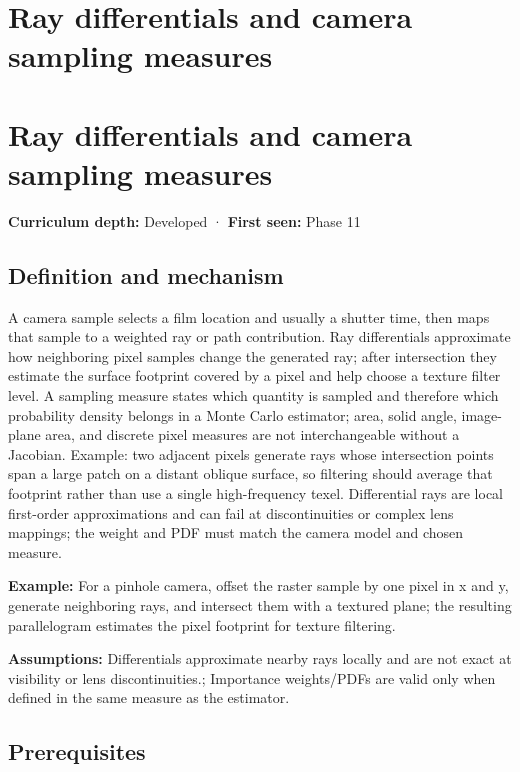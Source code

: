 \hypertarget{appendix-8c40fad29462}{}
\section*{Ray differentials and camera sampling measures}
\section{Ray differentials and camera sampling measures}\label{appendix-8c40fad29462-ray-differentials-and-camera-sampling-measures}

\textbf{Curriculum depth:} Developed · \textbf{First seen:} Phase 11

\subsection{Definition and mechanism}\label{appendix-8c40fad29462-definition-and-mechanism}

A camera sample selects a film location and usually a shutter time, then maps that sample to a weighted ray or path contribution. Ray differentials approximate how neighboring pixel samples change the generated ray; after intersection they estimate the surface footprint covered by a pixel and help choose a texture filter level. A sampling measure states which quantity is sampled and therefore which probability density belongs in a Monte Carlo estimator; area, solid angle, image-plane area, and discrete pixel measures are not interchangeable without a Jacobian. Example: two adjacent pixels generate rays whose intersection points span a large patch on a distant oblique surface, so filtering should average that footprint rather than use a single high-frequency texel. Differential rays are local first-order approximations and can fail at discontinuities or complex lens mappings; the weight and PDF must match the camera model and chosen measure.

\textbf{Example:} For a pinhole camera, offset the raster sample by one pixel in x and y, generate neighboring rays, and intersect them with a textured plane; the resulting parallelogram estimates the pixel footprint for texture filtering.

\textbf{Assumptions:} Differentials approximate nearby rays locally and are not exact at visibility or lens discontinuities.; Importance weights/PDFs are valid only when defined in the same measure as the estimator.

\subsection{Prerequisites}\label{appendix-8c40fad29462-prerequisites}

